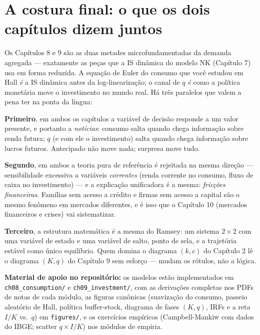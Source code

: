 \documentclass[11pt,a4paper]{article}
\newcommand{\ideia}[1]{\textcolor{destaque}{\textbf{#1}}}
\begin{document}
\section{A costura final: o que os dois capítulos dizem juntos}

Os Capítulos 8 e 9 são as duas metades microfundamentadas da demanda
agregada --- exatamente as peças que a IS dinâmica do modelo NK
(Capítulo 7) usa em forma reduzida. A equação de Euler do consumo que
você estudou em Hall \emph{é} a IS dinâmica antes da log-linearização;
o canal de $q$ \emph{é} como a política monetária move o investimento
no mundo real. Há três paralelos que valem a pena ter na ponta da língua:

\ideia{Primeiro}, em ambos os capítulos a variável de decisão responde
a um valor presente, e portanto a \emph{notícias}: consumo salta quando
chega informação sobre renda futura; $q$ (e com ele o investimento)
salta quando chega informação sobre lucros futuros. Antecipado não move
nada; surpresa move tudo.

\ideia{Segundo}, em ambos a teoria pura de referência é rejeitada na
mesma direção --- sensibilidade excessiva a variáveis \emph{correntes}
(renda corrente no consumo, fluxo de caixa no investimento) --- e a
explicação unificadora é a mesma: \emph{fricções financeiras}. Famílias
sem acesso a crédito e firmas sem acesso a capital são o mesmo fenômeno
em mercados diferentes, e é isso que o Capítulo 10 (mercados financeiros
e crises) vai sistematizar.

\ideia{Terceiro}, a estrutura matemática é a mesma do Ramsey: um sistema
$2\times 2$ com uma variável de estado e uma variável de salto, ponto de
sela, e a trajetória estável como único equilíbrio. Quem domina o
diagrama $(k,c)$ do Capítulo 2 lê o diagrama $(K,q)$ do Capítulo 9 sem
esforço --- mudam os rótulos, não a lógica.

\bigskip
\noindent\textbf{Material de apoio no repositório:} os modelos estão
implementados em \texttt{ch08\_consumption/} e \texttt{ch09\_investment/},
com as derivações completas nos PDFs de notas de cada módulo, as figuras
canônicas (suavização do consumo, passeio aleatório de Hall, política
buffer-stock, diagrama de fases $(K,q)$, IRFs e a reta $I/K$ vs.\ $q$)
em \texttt{figures/}, e os exercícios empíricos (Campbell-Mankiw com
dados do IBGE; scatter $q \times I/K$) nos módulos de empiria.
\end{document}
